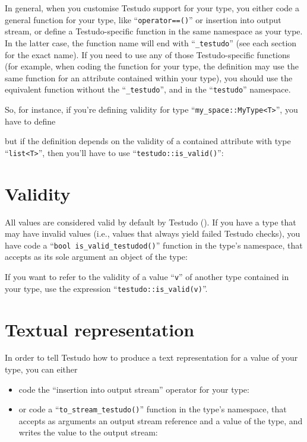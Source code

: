 \documentclass[twoside, a4paper, article]{memoir}
\providecommand\typesetexample[1]{%
}
\begin{document}
In general, when you customise Testudo support for your type, you either code a
general function for your type, like ``\texttt{operator==()}'' or insertion
into output stream, or define a Testudo-specific function in the same namespace
as your type.  In the latter case, the function name will end with
``\texttt{\_testudo}'' (see each section for the exact name).  If you need to
use any of those Testudo-specific functions (for example, when coding the
function for your type, the definition may use the same function for an
attribute contained within your type), you should use the equivalent function
without the ``\texttt{\_testudo}'', and in the ``\texttt{testudo}'' namespace.

So, for instance, if you're defining validity for type
``\texttt{my\_space::MyType<T>}'', you have to define

\typesetexample{testudo-support-my-type-is-valid-testudo}

but if the definition depends on the validity of a contained attribute with
type ``\texttt{list<T>}'', then you'll have to use
``\texttt{testudo::is\_valid()}'':

\typesetexample{testudo-support-my-type-is-valid-testudo-is-valid}


\section{Validity}
\label{sec:validity}

All values are considered valid by default by Testudo
().  If you have a type that may have invalid
values (i.e., values that always yield failed Testudo checks), you have code a
``\texttt{bool is\_valid\_testudod()}'' function in the type's namespace, that
accepts as its sole argument an object of the type:

\typesetexample{testudo-support-my-vector-is-valid-testudo}

If you want to refer to the validity of a value ``\texttt{v}'' of another type
contained in your type, use the expression ``\texttt{testudo::is\_valid(v)}''.

\section{Textual representation}
\label{sec:textual-representation}

In order to tell Testudo how to produce a text representation for a value of
your type, you can either
\begin{itemize}
\item code the ``insertion into output stream'' operator for your type:

  \typesetexample{testudo-support-my-vector-insertion}

\item or code a ``\texttt{to\_stream\_testudo()}'' function in the type's
  namespace, that accepts as arguments an output stream reference and a value
  of the type, and writes the value to the output stream:

  \typesetexample{testudo-support-my-vector-to-stream-testudo}
\end{itemize}
\end{document}
